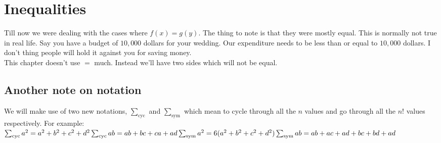 \chapter{Inequalities}
Till now we were dealing with the cases where $f(x)=g(y)$. The thing to note is that they were mostly equal. This is normally not true in real life. Say you have a budget of $10,000$ dollars for your wedding. Our expenditure needs to be less than or equal to $10,000$ dollars. I don't thing people will hold it against you for saving money.\\
This chapter doesn't use $=$ much. Instead we'll have two sides which will not be equal.\\
\section{Another note on notation}
We will make use of two new notations, $\sum_{\text{cyc}}$ and $\sum_{\text{sym}}$ which mean to cycle through all the $n$ values and go through all the $n!$ values respectively. For example:\\
$\sum_{\text{cyc}}a^2=a^2+b^2+c^2+d^2\\
\sum_{\text{cyc}}ab=ab+bc+ca+ad\\
\sum_{\text{sym}}a^2=6(a^2+b^2+c^2+d^2)\\
\sum_{\text{sym}}ab=ab+ac+ad+bc+bd+ad\\$
